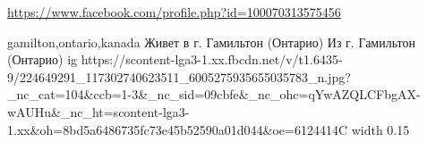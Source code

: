  
 
 
 
 

\url{https://www.facebook.com/profile.php?id=100070313575456}\par
gamilton,ontario,kanada
Живет в г. Гамильтон (Онтарио)
Из г. Гамильтон (Онтарио)
\ifcmt
  ig https://scontent-lga3-1.xx.fbcdn.net/v/t1.6435-9/224649291_117302740623511_6005275935655035783_n.jpg?_nc_cat=104&ccb=1-3&_nc_sid=09cbfe&_nc_ohc=qYwAZQLCFbgAX-wAUHu&_nc_ht=scontent-lga3-1.xx&oh=8bd5a6486735fc73e45b52590a01d044&oe=6124414C
  width 0.15
\fi

